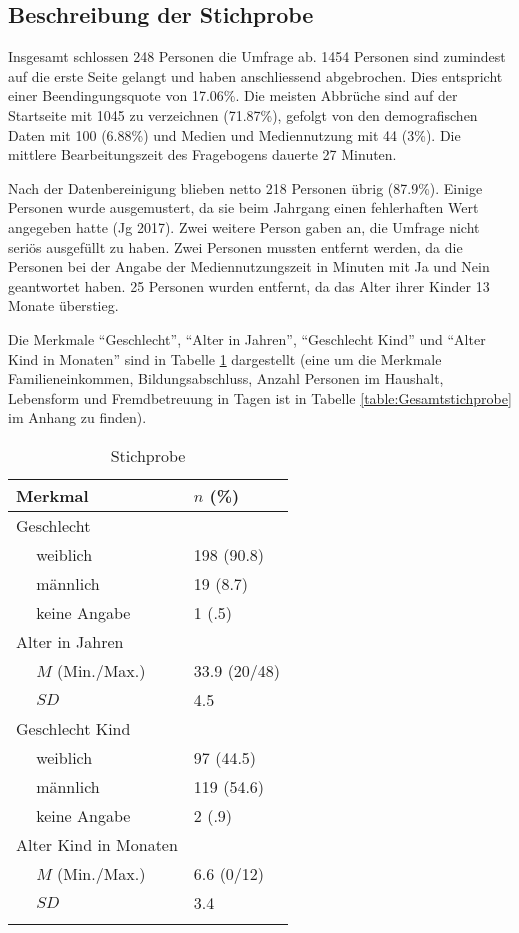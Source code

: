 \subsection{Beschreibung der Stichprobe}
Insgesamt schlossen 248 Personen die Umfrage ab. 1454 Personen sind zumindest auf die erste Seite gelangt und haben anschliessend abgebrochen. Dies entspricht einer Beendingungsquote von 17.06\%. Die meisten Abbrüche sind auf der Startseite mit 1045 zu verzeichnen (71.87\%), gefolgt von den demografischen Daten mit 100 (6.88\%) und Medien und Mediennutzung mit 44 (3\%). Die mittlere Bearbeitungszeit des Fragebogens dauerte 27 Minuten. 

Nach der Datenbereinigung blieben netto 218 Personen übrig (87.9\%). Einige Personen wurde ausgemustert, da sie beim Jahrgang einen fehlerhaften Wert angegeben hatte (Jg 2017). Zwei weitere Person gaben an, die Umfrage nicht seriös ausgefüllt zu haben. Zwei Personen mussten entfernt werden, da die Personen bei der Angabe der Mediennutzungszeit in Minuten mit Ja und Nein geantwortet haben. 25 Personen wurden entfernt, da das Alter ihrer Kinder 13 Monate überstieg. 

Die Merkmale \enquote{Geschlecht}, \enquote{Alter in Jahren}, \enquote{Geschlecht Kind} und \enquote{Alter Kind in Monaten} sind in Tabelle \ref{table:Stichprobe} dargestellt (eine um die Merkmale Familieneinkommen, Bildungsabschluss, Anzahl Personen im Haushalt, Lebensform und Fremdbetreuung in Tagen ist in Tabelle \ref{table:Gesamtstichprobe} im Anhang zu finden).

\begin{table}[htbp]
\begin{tabular}{m{0.5em}  m{10em}  m{5em}} 
  \hline\hline
  \multicolumn{2}{l}{\textbf{Merkmal}} & \textbf{$n$ (\%)} \\
  \hline
  \multicolumn{2}{l}{Geschlecht} \\ 
   & weiblich & 198 (90.8)\\ 
   & männlich & 19 (8.7)\\ 
   & keine Angabe & 1 (.5)\\ 
   
  \multicolumn{2}{l}{Alter in Jahren} \\
   & $M$ (Min./Max.) & 33.9 (20/48) \\
   & $SD$ & 4.5 \\
  
  \multicolumn{2}{l}{Geschlecht Kind} \\
   & weiblich & 97 (44.5)\\ 
   & männlich & 119 (54.6)\\ 
   & keine Angabe & 2 (.9)\\
  
  \multicolumn{2}{l}{Alter Kind in Monaten} \\
   &  $M$ (Min./Max.) & 6.6 (0/12)\\
   & $SD$ & 3.4\\
  \hline\hline
  &&\\
\end{tabular}
\caption{Stichprobe}
\label{table:Stichprobe}
\end{table}


